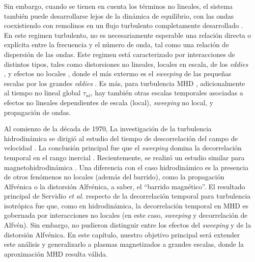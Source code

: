 Sin embargo, cuando se tienen en cuenta los términos no lineales, el
sistema también puede desarrollarse lejos de la dinámica de
equilibrio, con las ondas coexistiendo con remolinos en un flujo
turbulento completamente desarrollado \cite{dmitruk_waves_2009}.  En
este regimen turbulento, no es necesariamente esperable una relación
directa o explícita entre la frecuencia y el número de onda, tal como
una relación de dispersión de las ondas.  Este regimen está
caracterizado por interacciones de distintos tipos, tales como
distorsiones no lineales, locales en escala, de los \textit{eddies}
\cite{monin_statistical_2013, kolmogorov_local_1941,
  mccomb_physics_1992}, y efectos no locales
\cite{alexakis_turbulent_2007, alexakis_anisotropic_2007,
  teaca_energy_2009, mininni_scale_2011}, donde el más extermo es el
\textit{sweeping} de las pequeñas escalas por los grandes
\textit{eddies} \cite{kraichnan_structure_1959,
  tennekes_eulerian_1975, chen_sweeping_1989, nelkin_time_1990}.  Es
más, para turbulencia MHD \cite{pouquet_strong_1976,
  zhou_magnetohydrodynamic_2004}, adicionalmente al tiempo no lineal
global $\tau_{nl}$, hay también otras escalas temporales asociadas a
efectos no lineales dependientes de escala (local), \textit{sweeping}
no local, y propagación de ondas.

Al comienzo de la década de 1970, La investigación de la turbulencia
hidrodinámica se dirigió al estudio del tiempo de descorrelación del
campo de velocidad \cite{orszag_numerical_1972,
  orszag_analytical_1970, tennekes_eulerian_1975, heisenberg_zur_1948,
  comte-bellot_simple_1971}.  La conclusión principal fue que el
\textit{sweeping} domina la decorrelación temporal en el rango
inercial \cite{zhou_non-gaussian_1993,
  sanada_random_1992}. Recientemente, se realizó un estudio similar
para magnetohidrodinámica \cite{servidio_time_2011,
  matthaeus_eulerian_2010, carbone_anisotropy_2011}.  Una diferencia
con el caso hidrodinámico es la presencia de otros fenómenos no
locales (además del barrido), como la propagación Alfv\'enica o la
distorsión Alfv\'enica, a saber, el ``barrido magnético''.  El
resultado principal de Servidio {\it et al.}
\cite{servidio_time_2011} respecto de la decorrelación temporal para
turbulencia isotrópica fue que, como en hidrodinámica, la
decorrelación temporal en MHD es gobernada por interacciones no
locales (en este caso, \textit{sweeping} y decorrelación de
Alfv\'en). Sin embargo, no pudieron distinguir entre los efectos del
\textit{sweeping} y de la distorsión Alfv\'enica. En este capítulo,
nuestro objetivo principal será extender este análisis y generalizarlo
a plasmas magnetizados a grandes escalas, donde la aproximación MHD
resulta válida.

